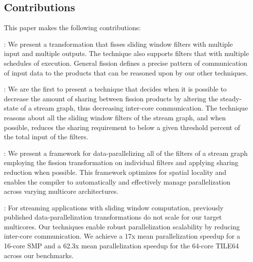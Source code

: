 \subsection{Contributions}
This paper makes the following contributions:
\begin{itemize}

  : We present a
  transformation that fisses sliding window filters with multiple
  input and multiple outputs.  The technique also supports filters
  that with multiple schedules of execution.  General fission defines
  a precise pattern of communication of input data to the products
  that can be reasoned upon by our other techniques.

  : We are the first to present a technique
  that decides when it is possible to decrease the amount of sharing
  between fission products by altering the steady-state of a stream
  graph, thus decreasing inter-core communication.  The technique
  reasons about all the sliding window filters of the stream graph,
  and when possible, reduces the sharing requirement to below a given
  threshold percent of the total input of the filters. 

  : We present a
  framework for data-parallelizing all of the filters of a stream
  graph employing the fission transformation on individual filters and
  applying sharing reduction when possible.  This framework optimizes
  for spatial locality and enables the compiler to automatically and
  effectively manage parallelization across varying multicore
  architectures.

  : For
  streaming applications with sliding window computation, previously
  published data-parallelization transformations do not scale for our
  target multicores. Our techniques enable robust parallelization
  scalability by reducing inter-core communication.  We achieve a 17x
  mean parallelization speedup for a 16-core SMP and a 62.3x mean
  parallelization speedup for the 64-core TILE64 across our benchmarks.

\end{itemize}


